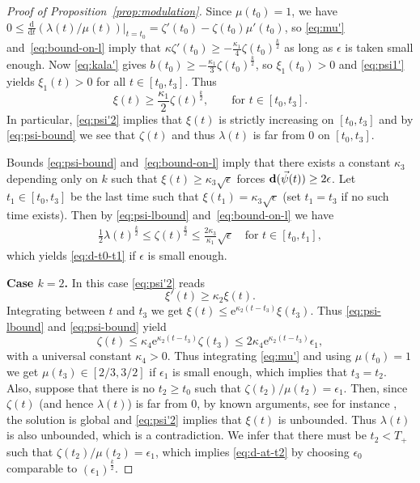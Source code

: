 \documentclass[10pt,reqno]{amsart}
\newcommand{\eee}{\mathrm e}
\newcommand{\la}{\lambda}
\newcommand{\EQ}[1]{\begin{equation}\begin{split} #1 \end{split}\end{equation}}
\numberwithin{equation}{section}
\theoremstyle{remark}
\newcommand{\dd}[1]{\frac{\ud}{\ud{#1}}}
\newcommand{\ud}{\mathrm{d}}
\newcommand{\0}{\emptyset}
\newcommand{\eps}{\epsilon}
\newcommand{\bfd}{{\bf d}}
\begin{document}
\begin{proof}[Proof of Proposition~\ref{prop:modulation}]
Since $\mu(t_0) = 1$, we have $0 \leq \dd t(\lambda(t)/\mu(t))\vert_{t = t_0} = \zeta'(t_0) - \zeta(t_0)\mu'(t_0)$, so \eqref{eq:mu'} and~\eqref{eq:bound-on-l} imply that $\kappa \zeta'(t_0) \geq -\frac{\kappa_1}{4}\zeta(t_0)^\frac k2$ as long as $\eps$ is taken small enough. Now \eqref{eq:kala'} gives $b(t_0) \geq -\frac{\kappa_1}{3}\zeta(t_0)^\frac k2$,
so $\xi_1(t_0) > 0$ and \eqref{eq:psi1'} yields $\xi_1(t) > 0$ for all $t \in [t_0, t_3]$.
Thus
\begin{equation}
\label{eq:psi-lbound}
\xi(t) \geq \frac{\kappa_1}{2}\zeta(t)^\frac k2, \qquad \text{for }t \in [t_0, t_3].
\end{equation}
In particular, \eqref{eq:psi'2} implies that $\xi(t)$ is strictly increasing on $[t_0, t_3]$
and by \eqref{eq:psi-bound} we see that  $\zeta(t)$ and thus $\la(t)$  is far from $0$ on $[t_0, t_3]$.

Bounds \eqref{eq:psi-bound} and~\eqref{eq:bound-on-l} imply that there exists a constant $\kappa_3$ depending only on $k$
such that $\xi(t) \geq \kappa_3 \sqrt{\eps}$ forces $\bfd(\vec \psi(t)) \geq 2\eps$.
Let $t_1 \in [t_0, t_3]$ be the last time such that $\xi(t_1) = \kappa_3 \sqrt{\eps}$
(set $t_1 = t_3$ if no such time exists).
Then by \eqref{eq:psi-lbound} and~\eqref{eq:bound-on-l}  we have
\EQ{
\frac{1}{2} \lambda(t)^\frac k2  \le \zeta(t)^{\frac{k}{2}} \leq \frac{2\kappa_3}{\kappa_1}\sqrt\eps\quad\text{for }t\in[t_0, t_1],
}
which yields \eqref{eq:d-t0-t1} if $\eps$ is small enough.

\textbf{Case $k = 2$.}
In this case \eqref{eq:psi'2} reads
\begin{equation}
\label{eq:psi'3}
\xi'(t) \geq \kappa_2 \xi(t).
\end{equation}
Integrating between $t$ and $t_3$ we get $\xi(t) \leq \eee^{\kappa_2(t - t_3)}\xi(t_3)$.
Thus \eqref{eq:psi-lbound} and \eqref{eq:psi-bound} yield
\begin{equation}
\zeta(t) \leq \kappa_4 \eee^{\kappa_2(t - t_3)}\zeta(t_3) \leq 2 \kappa_4 \eee^{\kappa_2(t - t_3)}\eps_1,
\end{equation}
with a universal constant $\kappa_4 > 0$. Thus integrating \eqref{eq:mu'} and using $\mu(t_0) = 1$
we get $\mu(t_3) \in [2/3, 3/2]$ if $\eps_1$ is small enough, which implies that $t_3 = t_2$.
Also, suppose that there is no $t_2 \geq t_0$ such that $\zeta(t_2)/\mu(t_2) = \eps_1$.
Then, since $\zeta(t)$ (and hence $\la(t)$) is far from $0$, by known arguments,
see for instance \cite[Corollary A.4]{JJ-AJM},
the solution is global and \eqref{eq:psi'2} implies that $\xi(t)$ is unbounded.
Thus $\lambda(t)$ is also unbounded, which is a contradiction.
We infer that there must be $t_2 < T_+$ such that $\zeta(t_2)/\mu(t_2) = \eps_1$,
which implies \eqref{eq:d-at-t2} by choosing $\eps_0$ comparable to $(\eps_1)^{\frac k2}$.


\end{proof}
\end{document}
